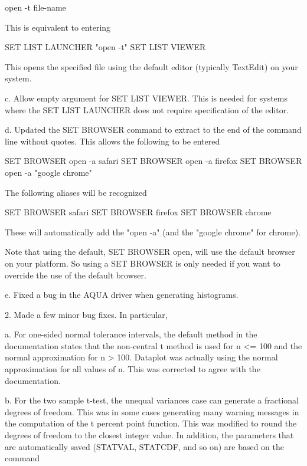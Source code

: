            open -t file-name

       This is equivalent to entering

           SET LIST LAUNCHER "open -t"
           SET LIST VIEWER

       This opens the specified file using the default editor
       (typically TextEdit) on your system.

    c. Allow empty argument for SET LIST VIEWER.  This is needed
       for systems where the SET LIST LAUNCHER does not require
       specification of the editor.

    d. Updated the SET BROWSER command to extract to the end of the
       command line without quotes.  This allows the following to be
       entered

           SET BROWSER open -a safari
           SET BROWSER open -a firefox
           SET BROWSER open -a "google chrome"

       The following aliases will be recognized

           SET BROWSER safari
           SET BROWSER firefox
           SET BROWSER chrome

       These will automatically add the "open -a" (and the
       "google chrome" for chrome).

       Note that using the default, SET BROWSER open, will use the
       default browser on your platform.  So using a SET BROWSER is
       only needed if you want to override the use of the default
       browser.

    e. Fixed a bug in the AQUA driver when generating histograms.

 2. Made a few minor bug fixes.  In particular,

    a. For one-sided normal tolerance intervals, the default method
       in the documentation states that the non-central t method is
       used for n <= 100 and the normal approximation for n > 100.
       Dataplot was actually using the normal approximation for all
       values of n.  This was corrected to agree with the documentation.

    b. For the two sample t-test, the unequal variances case can
       generate a fractional degrees of freedom.  This was in some
       cases generating many warning messages in the computation of
       the t percent point function.  This was modified to round the
       degrees of freedom to the closest integer value.  In addition,
       the parameters that are automatically saved (STATVAL, STATCDF,
       and so on) are based on the command

